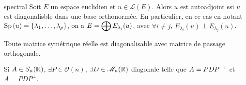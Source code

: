 \begin{theoreme}{spectral}{}
    Soit $E$ un espace euclidien et $u \in \mathscr L(E)$. Alors $u$ est 
    autoadjoint ssi $u$ est diagonalisble dans une base orthonormée. 
    En particulier, en ce cas en notant $\operatorname{Sp} \,(u) = \{\lambda_1, \dots, \lambda_p\}$, on a 
    $E = \displaystyle \bigoplus E_{\lambda_i} (u)$, avec $\forall i \neq j$, $E_{\lambda_i}(u) \perp E_{\lambda_j}(u)$. 
\end{theoreme}


Toute matrice symétrique réelle est diagonalisable avec matrice de passage orthogonale. 

Si $A \in S_n(\mathbb{R})$, $\exists P \in \mathcal O(n)$, 
$\exists D \in \mathscr M_n(\mathbb{R})$ diagonale telle que $A = PDP^{-1}$ et 
$A = PDP^\perp$. 


